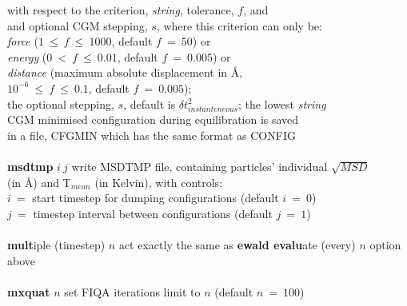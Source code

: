 \begin{tabbing}
\>                                              \> with respect to the criterion, {\em string}, tolerance, $f$, and \\
\>                                              \> and optional CGM stepping, $s$, where this criterion can only be: \\
\>                                              \> {\em force} ($1~\le~f~\le~1000$, default $f~=~50$) or \\
\>                                              \> {\em energy} ($0~<~f~\le~0.01$, default $f~=~0.005$) or \\
\>                                              \> {\em distance} (maximum absolute displacement in \AA, \\
\>                                              \> $10^{-6}~\le~f~\le~0.1$, default $f~=~0.005$); \\
\>                                              \> the optional stepping, $s$, default is $\delta t_{instanteneous}^{2}$; the lowest {\em string} \\
\>                                              \> CGM minimised configuration during equilibration is saved \\
\>                                              \> in a file, CFGMIN which has the same format as CONFIG \\
\>                                              \> \\
\> {\bf msdtmp} $i~j$                           \> write MSDTMP file, containing particles' individual $\sqrt{MSD}$ \\
\>                                              \> (in \AA) and T$_{mean}$ (in Kelvin), with controls: \\
\>                                              \> $i~=$ start timestep for dumping configurations (default $i~=~0$) \\
\>                                              \> $j~=$ timestep interval between configurations (default $j~=~1$) \\
\>                                              \> \\
\> {\bf mult}iple (timestep) $n$                \> act exactly the same as {\bf ewald evalu}ate (every) $n$ option above \\
\>                                              \> \\
\> {\bf mxquat} $n$                             \> set FIQA iterations limit to $n$ (default $n~=~100$) \\

\end{tabbing}
